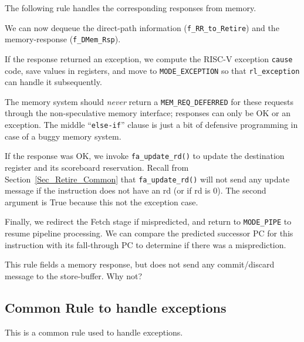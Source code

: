 \label{Sec_Fife_Retire_DMem_deferred}

The following rule handles the corresponding responses from memory.



We can now dequeue the direct-path information (\verb|f_RR_to_Retire|)
and the memory-response (\verb|f_DMem_Rsp|).

If the response returned an exception, we compute the RISC-V exception
\verb|cause| code, save values in registers, and move to
\verb|MODE_EXCEPTION| so that \verb|rl_exception| can handle it
subsequently.

The memory system should \emph{never} return a \verb|MEM_REQ_DEFERRED|
for these requests through the non-speculative memory interface;
responses can only be OK or an exception.  The middle
``\verb|else-if|'' clause is just a bit of defensive programming in
case of a buggy memory system.

If the response was OK, we invoke \verb|fa_update_rd()| to update the
destination register and its scoreboard reservation.  Recall from
Section~\ref{Sec_Retire_Common} that \verb|fa_update_rd()| will not
send any update message if the instruction does not have an rd (or if
rd is 0).  The second argument is True because this not the exception
case.

Finally, we redirect the Fetch stage if mispredicted, and return to
\verb|MODE_PIPE| to resume pipeline processing.  We can compare the
predicted successor PC for this instruction with its fall-through PC
to determine if there was a misprediction.


\Exercise

This rule fields a memory response, but does not send any
commit/discard message to the store-buffer.  Why not?

\Endexercise


\subsection{Common Rule to handle exceptions}

\label{Sec_Fife_Exception}

This is a common rule used to handle exceptions.




